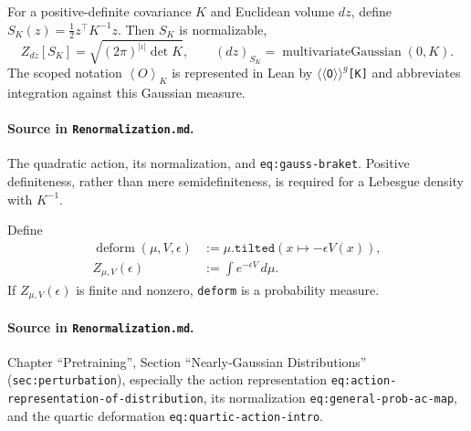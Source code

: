 \begin{theorem}
\label{thm:renorm:quadraticActionGaussian}
For a positive-definite covariance $K$ and Euclidean volume $dz$, define
$S_K(z)=\frac12 z^\top K^{-1}z$.  Then $S_K$ is normalizable,
\[
 Z_{dz}[S_K]=\sqrt{(2\pi)^{|\iota|}\det K},\qquad
 (dz)_{S_K}=\operatorname{multivariateGaussian}(0,K).
\]
The scoped notation $\left\langle O\right\rangle_K$ is represented in Lean by
\texttt{$\langle\!\langle$O$\rangle\!\rangle^{g}$[K]} and abbreviates integration against this
Gaussian measure.

\paragraph{Source in \texttt{Renormalization.md}.}
The quadratic action, its normalization, and \texttt{eq:gauss-braket}.  Positive definiteness,
rather than mere semidefiniteness, is required for a Lebesgue density with $K^{-1}$.
\end{theorem}

\begin{definition}
\label{def:renorm:deform}
Define
\begin{align*}
 \operatorname{deform}(\mu,V,\epsilon)
   &:=\mu.\texttt{tilted}(x\mapsto-\epsilon V(x)),\\
 Z_{\mu,V}(\epsilon)&:=\int e^{-\epsilon V}\,d\mu.
\end{align*}
If $Z_{\mu,V}(\epsilon)$ is finite and nonzero, \texttt{deform} is a probability measure.

\paragraph{Source in \texttt{Renormalization.md}.}
Chapter ``Pretraining'', Section ``Nearly-Gaussian Distributions'' (\texttt{sec:perturbation}),
especially the action representation \texttt{eq:action-representation-of-distribution}, its
normalization \texttt{eq:general-prob-ac-map}, and the quartic deformation
\texttt{eq:quartic-action-intro}.
\end{definition}

